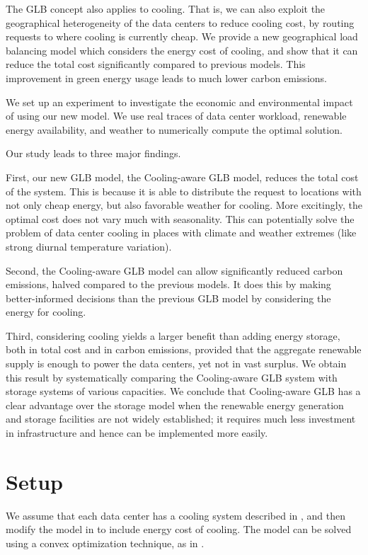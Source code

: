 \documentclass{acm_proc_article-sp}
\begin{document}
The GLB concept also applies to cooling. That is, we can also exploit the geographical heterogeneity of the data centers to reduce cooling cost, by routing requests to where cooling is currently cheap. We provide a new geographical load balancing model which considers the energy cost of cooling, and show that it can reduce the total cost significantly compared to previous models. This improvement in green energy usage leads to much lower carbon emissions.

We set up an experiment to investigate the economic and environmental impact of using our new model. We use real traces of data center workload, renewable energy availability, and weather to numerically compute the optimal solution.%

Our study leads to three major findings.

First, our new GLB model, the Cooling-aware GLB model, reduces the total cost of the system. This is because it is able to distribute the request to locations with not only cheap energy, but also favorable weather for cooling. More excitingly, the optimal cost does not vary much with seasonality. This can potentially solve the problem of data center cooling in places with climate and weather extremes (like strong diurnal temperature variation).

Second, the Cooling-aware GLB model can allow significantly reduced carbon emissions, halved compared to the previous models. It does this by making better-informed decisions than the previous GLB model by considering the energy for cooling.

Third, considering cooling yields a larger benefit than adding energy storage, both in total cost and in carbon emissions, provided that the aggregate renewable supply is enough to power the data centers, yet not in vast surplus. We obtain this result by systematically comparing the Cooling-aware GLB system with storage systems of various capacities. We conclude that Cooling-aware GLB has a clear advantage over the storage model when the renewable energy generation and storage facilities are not widely established; it requires much less investment in infrastructure and hence can be implemented more easily.

\section{Setup}
We assume that each data center has a cooling system described in \cite{adam:cooling}, and then modify the model in \cite{adam:GLB} to include energy cost of cooling. The model can be solved using a convex optimization technique, as in \cite{adam:GLBfull}.
\end{document}
